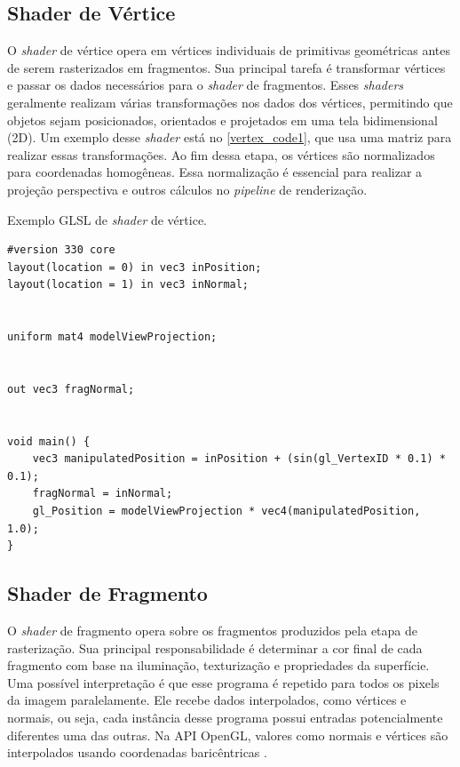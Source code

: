 \documentclass[english,
               brazil,
               bsc] %
               {dcomp-abntex2}
\begin{document}
\subsection{Shader de Vértice}


O \textit{shader} de vértice opera em vértices individuais de primitivas geométricas antes de serem rasterizados em fragmentos. Sua principal tarefa é transformar vértices e passar os dados necessários para o \textit{shader} de fragmentos. Esses \textit{shaders} geralmente realizam várias transformações nos dados dos vértices, permitindo que objetos sejam posicionados, orientados e projetados em uma tela bidimensional (2D). Um exemplo desse \textit{shader} está no \autoref{vertex_code1}, que usa uma matriz para realizar essas transformações. Ao fim dessa etapa, os vértices são normalizados para coordenadas homogêneas. Essa normalização é essencial para realizar a projeção perspectiva e outros cálculos no \textit{pipeline} de renderização.




\begin{codigo}[H]
  \caption{\small Exemplo GLSL de \textit{shader} de vértice.}
 \label{vertex_code1}
\begin{lstlisting}
#version 330 core
layout(location = 0) in vec3 inPosition;
layout(location = 1) in vec3 inNormal;


uniform mat4 modelViewProjection;


out vec3 fragNormal;


void main() {
    vec3 manipulatedPosition = inPosition + (sin(gl_VertexID * 0.1) * 0.1);
    fragNormal = inNormal;
    gl_Position = modelViewProjection * vec4(manipulatedPosition, 1.0);
}
\end{lstlisting}
\end{codigo}


\subsection{Shader de Fragmento}


O \textit{shader} de fragmento opera sobre os fragmentos produzidos pela etapa de rasterização. Sua principal responsabilidade é determinar a cor final de cada fragmento com base na iluminação, texturização e propriedades da superfície. Uma possível interpretação é que esse programa é repetido para todos os pixels da imagem paralelamente.  Ele recebe dados interpolados, como vértices e normais, ou seja, cada instância desse programa possui entradas potencialmente diferentes uma das outras. Na API OpenGL, valores como normais e vértices são interpolados usando coordenadas baricêntricas \cite{opengl_interpolation}.
\end{document}
